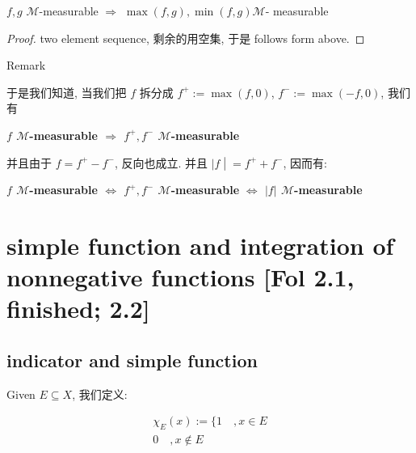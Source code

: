 \begin{corollary}

\(f,g\) \(\mathcal{M}\)-measurable \(\Longrightarrow\) \(\max(f,g),\min(f,g)\)\(\mathcal{M}\)- measurable

\end{corollary}

\begin{proof}

two element sequence, 剩余的用空集, 于是 follows form above.

\end{proof}

\begin{qlremark}{Remark}

于是我们知道, 当我们把 \(f\) 拆分成 \(f^{+} := \max(f,0)\), \(f^{-} := \max( - f,0)\), 我们有

\textbf{\(f\) \(\mathcal{M}\)-measurable \(\Longrightarrow\) \(f^{+},f^{-}\) \(\mathcal{M}\)-measurable}

并且由于 \(f = f^{+} - f^{-}\), 反向也成立. 并且 \(\left. |f \middle| = f^{+} + f^{-} \right.\), 因而有:

\textbf{\(f\) \(\mathcal{M}\)-measurable \(\Leftrightarrow\) \(f^{+},f^{-}\) \(\mathcal{M}\)-measurable} \textbf{\(\Leftrightarrow\) \(|f|\) \(\mathcal{M}\)-measurable}

\end{qlremark}

\section{simple function and integration of nonnegative functions {[}Fol 2.1, finished; 2.2{]}}

\subsection{indicator and simple function}\label{indicator-and-simple-function}

\begin{definition}{}

Given \(E \subseteq X\), 我们定义:

\[\begin{matrix}
{\chi_{E}(x) := \{ 1\quad,x \in E} \\
{0\quad,x \notin E}
\end{matrix}\]

\end{definition}

